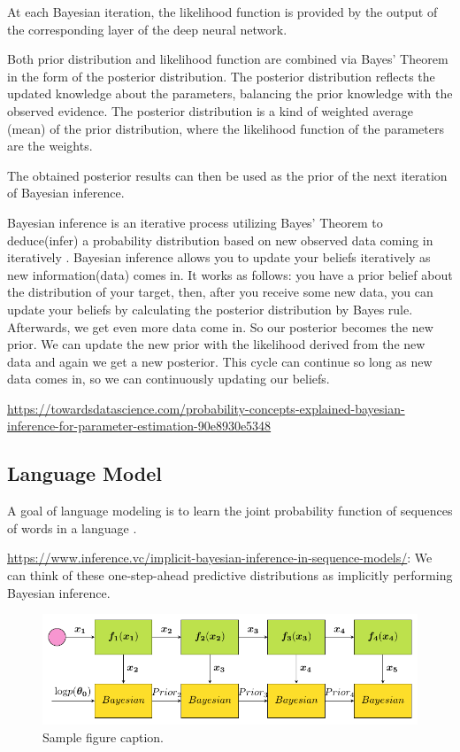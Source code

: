 \documentclass{article}
\begin{document}
At each Bayesian iteration, the likelihood function is provided by the output of the corresponding layer of the deep neural network.

Both prior distribution and likelihood function are combined via Bayes' Theorem in the form of the posterior distribution. The posterior distribution reflects the updated knowledge about the parameters, balancing the prior knowledge with the observed evidence.
The posterior distribution is a kind of weighted average (mean) of the prior distribution, where the likelihood function of the parameters are the weights. 

The obtained posterior results can then be used as the prior of the next iteration of Bayesian inference.

Bayesian inference is an iterative process utilizing Bayes' Theorem to deduce(infer) a probability distribution based on new observed data coming in iteratively \citep{harper2009replicator}.
Bayesian inference allows you to update your beliefs iteratively as new information(data) comes in. It works as follows: you have a prior belief about the distribution of your target, then, after you receive some new data, you can update your beliefs by calculating the posterior distribution by Bayes rule. Afterwards, we get even more data come in. So our posterior becomes the new prior. We can update the new prior with the likelihood derived from the new data and again we get a new posterior. This cycle can continue so long as new data comes in, so we can continuously updating our beliefs.

\url{https://towardsdatascience.com/probability-concepts-explained-bayesian-inference-for-parameter-estimation-90e8930e5348}


\subsection{Language Model}

A goal of language modeling is to learn the joint probability function of sequences of words in a language \citep{bengio2000neural}.


\url{https://www.inference.vc/implicit-bayesian-inference-in-sequence-models/}:
We can think of these one-step-ahead predictive distributions as implicitly performing Bayesian inference.

\begin{figure}
  \centering
  \includegraphics{dbi_diagram.pdf}
  \caption{Sample figure caption.}
\end{figure}
\end{document}
